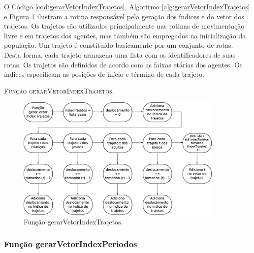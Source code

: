 O Código \ref{cod:gerarVetorIndexTrajetos}, Algoritmo \ref{alg:gerarVetorIndexTrajetos} e Figura \ref{fig:gerarVetorIndexTrajetos} ilustram a rotina responsável pela geração dos índices e do vetor dos trajetos. Os trajetos são utilizados principalmente nas rotinas de movimentação livre e em trajetos dos agentes, mas também são empregados na inicialização da população. Um trajeto é constituído basicamente por um conjunto de rotas. Desta forma, cada trajeto armazena uma lista com os identificadores de suas rotas. Os trajetos são definidos de acordo com as faixas etárias dos agentes. Os índices especificam as posições de início e término de cada trajeto. 



\begin{algorithm}[H]
   \SetAlgoLined   
   
   \caption{\textsc{Função gerarVetorIndexTrajetos.}}
   \label{alg:gerarVetorIndexTrajetos}
\end{algorithm}

\begin{figure}[H]
  \centering
  \includegraphics[width=0.9\textwidth]{Figuras/Simula/Fluxos/gerarVetorIndexTrajetos.eps}
  \caption{Função gerarVetorIndexTrajetos.}
  \label{fig:gerarVetorIndexTrajetos}
\end{figure} 

\newpage

\subsubsection{Função gerarVetorIndexPeriodos}


